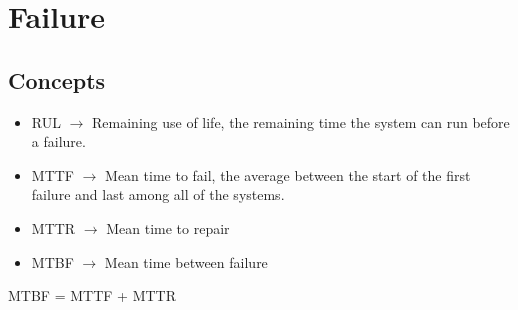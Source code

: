 \section{Failure}


\subsection{Concepts}
\begin{itemize}
	\item RUL $\rightarrow$ Remaining use of life, the remaining time the system can run before a failure.
	\item MTTF $\rightarrow$ Mean time to fail, the average between the start of the first failure and last among all of the systems.
	\item MTTR $\rightarrow$ Mean time to repair
	\item MTBF $\rightarrow$ Mean time between failure
\end{itemize}

MTBF = MTTF + MTTR
